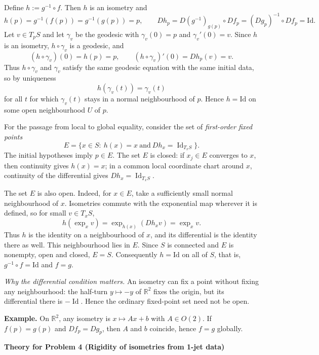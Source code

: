 \begin{solution}
Define $h:=g^{-1}\circ f$. Then $h$ is an isometry and
\[
h(p)=g^{-1}(f(p))=g^{-1}(g(p))=p,
\qquad
Dh_p=D(g^{-1})_{g(p)}\circ Df_p=(Dg_p)^{-1}\circ Df_p=\mathrm{Id}.
\]
Let $v\in T_pS$ and let $\gamma_v$ be the geodesic with $\gamma_v(0)=p$ and $\gamma_v'(0)=v$.
Since $h$ is an isometry, $h\circ\gamma_v$ is a geodesic, and
\[
(h\circ\gamma_v)(0)=h(p)=p,\qquad (h\circ\gamma_v)'(0)=Dh_p(v)=v.
\]
Thus $h\circ\gamma_v$ and $\gamma_v$ satisfy the same geodesic equation with the same initial data,
so by uniqueness
\[
h(\gamma_v(t))=\gamma_v(t)
\]
for all $t$ for which $\gamma_v(t)$ stays in a normal neighbourhood of $p$.
Hence $h=\mathrm{Id}$ on some open neighbourhood $U$ of $p$.

For the passage from local to global equality, consider the set of
\emph{first-order fixed points}
\[
E=\{x\in S:\ h(x)=x\ \text{and}\ Dh_x=\operatorname{Id}_{T_xS}\}.
\]
The initial hypotheses imply $p\in E$. The set $E$ is closed: if
$x_j\in E$ converges to $x$, then continuity gives $h(x)=x$;
in a common local coordinate chart around $x$, continuity of the
differential gives $Dh_x=\operatorname{Id}_{T_xS}$.

The set $E$ is also open. Indeed, for $x\in E$, take a sufficiently
small normal neighbourhood of $x$. Isometries commute with the
exponential map wherever it is defined, so for small $v\in T_xS$,
\[
h(\exp_x v)=\exp_{h(x)}(Dh_xv)=\exp_x v.
\]
Thus $h$ is the identity on a neighbourhood of $x$, and its
differential is the identity there as well. This neighbourhood
lies in $E$. Since $S$ is connected and $E$ is nonempty, open and
closed, $E=S$. Consequently $h=\mathrm{Id}$ on all of $S$,
that is, $g^{-1}\circ f=\mathrm{Id}$ and $f=g$.

\medskip
\noindent\emph{Why the differential condition matters.}
An isometry can fix a point without fixing any neighbourhood:
the half-turn $y\mapsto-y$ of $\mathbb R^2$ fixes the origin,
but its differential there is $-\operatorname{Id}$. Hence the
ordinary fixed-point set need not be open.

\medskip
\textbf{Example.}
On $\mathbb{R}^2$, any isometry is $x\mapsto Ax+b$ with $A\in O(2)$.
If $f(p)=g(p)$ and $Df_p=Dg_p$, then $A$ and $b$ coincide, hence $f=g$ globally.


\par\medskip\noindent\textbf{Theory for Problem 4 (Rigidity of isometries from 1-jet data)}\par\smallskip



\end{solution}

